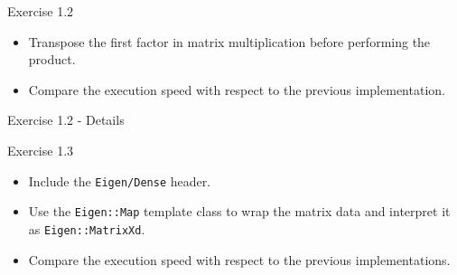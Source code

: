 \documentclass[10pt]{beamer}
\begin{document}
\begin{frame}{Exercise 1.2}
\begin{itemize}
\item Transpose the first factor in matrix multiplication before performing the product.
\item Compare the execution speed with respect to the previous implementation.
\end{itemize}
\end{frame}

\begin{frame}{Exercise 1.2 - Details}
\begin{figure}
    \centering
\end{figure}
\end{frame}

\begin{frame}{Exercise 1.3}
\begin{itemize}
\item Include the {\tt Eigen/Dense} header.
\item Use the {\tt Eigen::Map} template class to wrap the matrix data and interpret it as {\tt Eigen::MatrixXd}.
\item Compare the execution speed with respect to the previous implementations.
\end{itemize}
\end{frame}
\end{document}
